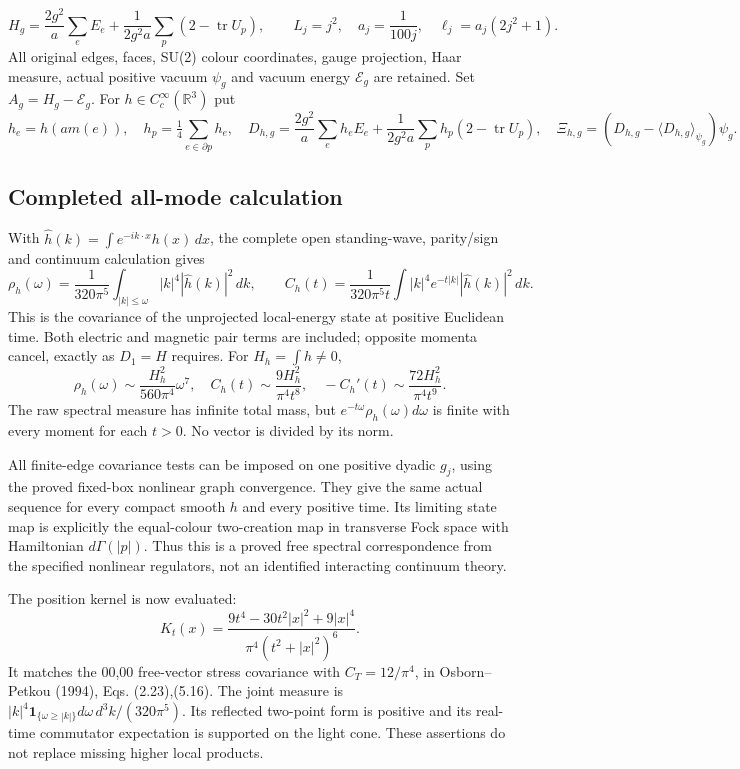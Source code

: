 \documentclass[
  11pt,
]{article}
\begin{document}
\[
 H_g=\frac{2g^2}{a}\sum_eE_e+\frac1{2g^2a}
                  \sum_p(2-\operatorname{tr}U_p),\qquad
 L_j=j^2,\quad a_j=\frac1{100j},\quad\ell_j=a_j(2j^2+1).
\] All original edges, faces, SU(2) colour coordinates, gauge
projection, Haar measure, actual positive vacuum \(\psi_g\) and vacuum
energy \(\mathcal E_g\) are retained. Set \(A_g=H_g-\mathcal E_g\). For
\(h\in C_c^\infty(\mathbb R^3)\) put \[
 h_e=h(am(e)),\quad h_p=\tfrac14\sum_{e\in\partial p}h_e,\quad
 D_{h,g}=\frac{2g^2}{a}\sum_eh_eE_e+
     \frac1{2g^2a}\sum_ph_p(2-\operatorname{tr}U_p),\quad
 \Xi_{h,g}=(D_{h,g}-\langle D_{h,g}\rangle_{\psi_g})\psi_g .
\]

\subsection{Completed all-mode
calculation}\label{weak-coupling-part-13-completed-all-mode-calculation}

With \(\widehat h(k)=\int e^{-ik\cdot x}h(x)\,dx\), the complete open
standing-wave, parity/sign and continuum calculation gives \[
 \rho_h(\omega)=\frac1{320\pi^5}
          \int_{|k|\le\omega}|k|^4|\widehat h(k)|^2\,dk,\qquad
 C_h(t)=\frac1{320\pi^5t}
          \int |k|^4e^{-t|k|}|\widehat h(k)|^2\,dk.
\] This is the covariance of the unprojected local-energy state at
positive Euclidean time. Both electric and magnetic pair terms are
included; opposite momenta cancel, exactly as \(D_1=H\) requires. For
\(H_h=\int h\ne0\), \[
 \rho_h(\omega)\sim\frac{H_h^2}{560\pi^4}\omega^7,\quad
 C_h(t)\sim\frac{9H_h^2}{\pi^4t^8},\quad
 -C_h'(t)\sim\frac{72H_h^2}{\pi^4t^9}.
\] The raw spectral measure has infinite total mass, but
\(e^{-t\omega}\rho_h(\omega)d\omega\) is finite with every moment for
each \(t>0\). No vector is divided by its norm.

All finite-edge covariance tests can be imposed on one positive dyadic
\(g_j\), using the proved fixed-box nonlinear graph convergence. They
give the same actual sequence for every compact smooth \(h\) and every
positive time. Its limiting state map is explicitly the equal-colour
two-creation map in transverse Fock space with Hamiltonian
\(d\Gamma(|p|)\). Thus this is a proved free spectral correspondence
from the specified nonlinear regulators, not an identified interacting
continuum theory.

The position kernel is now evaluated: \[
 K_t(x)=\frac{9t^4-30t^2|x|^2+9|x|^4}
                    {\pi^4(t^2+|x|^2)^6}.
\] It matches the 00,00 free-vector stress covariance with
\(C_T=12/\pi^4\), in Osborn--Petkou (1994), Eqs. (2.23),(5.16). The
joint measure is
\(|k|^4\mathbf1_{\{\omega\ge|k|\}}d\omega\,d^3k/(320\pi^5)\). Its
reflected two-point form is positive and its real-time commutator
expectation is supported on the light cone. These assertions do not
replace missing higher local products.
\end{document}
